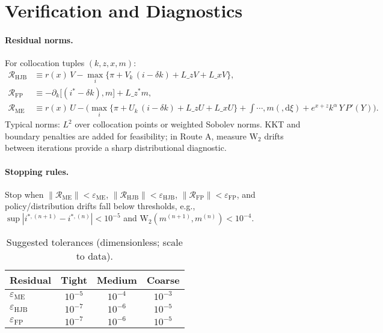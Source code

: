 \documentclass[11pt,letterpaper,oneside]{article}
\numberwithin{equation}{section}
\newcommand{\1}{\mathbf{1}}
\newcommand{\diff}{,\mathrm{d}}
\newcommand{\Lz}{L\_z}
\newcommand{\Lx}{L\_x}
\newcommand{\Lzadj}{L\_z^{\!*}}
\newcommand{\dxi}{, m(\diff \xi)}
\begin{document}
\section{Verification and Diagnostics}\label{sec:verification}

\paragraph{Residual norms.}
For collocation tuples $(k,z,x,m)$:
\begin{align*}
\mathcal{R}_{\mathrm{HJB}} &\equiv r(x)\, V - \max_{i}\{\pi + V_k\,(i-\delta k) + \Lz V + \Lx V\},\\
\mathcal{R}_{\mathrm{FP}}  &\equiv -\partial_k\big[(i^*-\delta k),m\big] + \Lzadj m,\\
\mathcal{R}_{\mathrm{ME}}  &\equiv r(x)\,U - \Big(\max_{i}\{\pi + U_k\,(i-\delta k) + \Lz U + \Lx U\}
  + \int\cdots\dxi
  + e^{x+z}k^\alpha\, Y\, P'(Y)\Big).
\end{align*}
  Typical norms: $L^2$ over collocation points or weighted Sobolev norms. KKT and boundary penalties are added for feasibility; in Route A, measure $\mathrm{W}_2$ drifts between iterations provide a sharp distributional diagnostic.

\paragraph{Stopping rules.}
Stop when $\|\mathcal{R}_{\mathrm{ME}}\|<\varepsilon_{\mathrm{ME}}$, $\|\mathcal{R}_{\mathrm{HJB}}\|<\varepsilon_{\mathrm{HJB}}$, $\|\mathcal{R}_{\mathrm{FP}}\|<\varepsilon_{\mathrm{FP}}$, and policy/distribution drifts fall below thresholds, e.g., $\sup|i^{*,(n+1)}-i^{*,(n)}|<10^{-5}$ and $\mathrm{W}_2(m^{(n+1)},m^{(n)})<10^{-4}$.

\begin{table}[ht]
\centering
\small
\begin{tabular}{@{}lccc@{}}
\toprule
Residual & Tight & Medium & Coarse \\
\midrule
$\varepsilon_{\mathrm{ME}}$ & $10^{-5}$ & $10^{-4}$ & $10^{-3}$ \\
$\varepsilon_{\mathrm{HJB}}$ & $10^{-7}$ & $10^{-6}$ & $10^{-5}$ \\
$\varepsilon_{\mathrm{FP}}$  & $10^{-7}$ & $10^{-6}$ & $10^{-5}$ \\
\bottomrule
\end{tabular}
\caption{Suggested tolerances (dimensionless; scale to data).}
\end{table}
\end{document}
